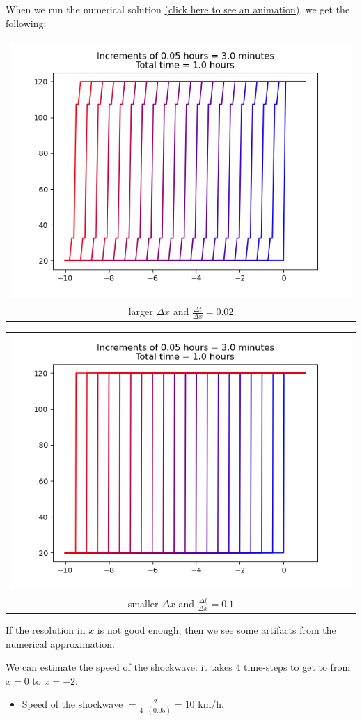\begin{solution}
\begin{slide}
\begin{parts}
\setcounter{partsitem}{1}
\item When we run the numerical solution \href{https://raw.githubusercontent.com/bigfatbernie/IBLMathModeling/main/book/images/traffic_flow-60.mp4}{(click here to see an animation)}, we get the following:

\hfil \begin{tabular}{c}
\includegraphics[width=.35\textwidth]{images/traffic_flow-60-deltax110.png} \\[-8pt]
larger $\Delta x$ and $\frac{\Delta t}{\Delta x} = 0.02$
\end{tabular}
\hfil \begin{tabular}{c}
\includegraphics[width=.35\textwidth]{images/traffic_flow-60-deltax550.png} \\[-8pt]
smaller $\Delta x$ and $\frac{\Delta t}{\Delta x} = 0.1$
\end{tabular}

If the resolution in $x$ is not good enough, then we see some artifacts from the numerical approximation.

We can estimate the speed of the shockwave: it takes 4 time-steps to get to from $x=0$ to $x=-2$:
\begin{itemize}
	\item Speed of the shockwave $= \frac{2}{4 \cdot (0.05)} = 10$ km/h.
\end{itemize}

\end{parts}
\end{slide}

\begin{slide}


\end{slide}
\end{solution}
